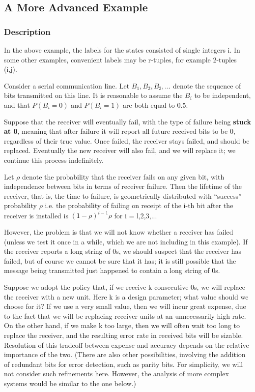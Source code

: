 \documentclass[11pt]{article}
\begin{document}
\subsection{A More Advanced Example}

\subsubsection{Description}

In the above example, the labels for the states consisted of single
integers i. In some other examples, convenient labels may be r-tuples,
for example 2-tuples (i,j).

Consider a serial communication line. Let $B_{1},B_{2},B_{3},...$ denote
the sequence of bits transmitted on this line. It is reasonable to assume the
$B_{i}$ to be independent, and that $P(B_{i}=0)$ and $P(B_{i}=1)$ are
both equal to 0.5.

Suppose that the receiver will eventually fail, with the type of failure
being \textbf{stuck at 0}, meaning that after failure it will report all
future received bits to be 0, regardless of their true value. Once
failed, the receiver stays failed, and should be replaced. Eventually
the new receiver will also fail, and we will replace it; we continue
this process indefinitely.

Let $\rho$ denote the probability that the receiver fails on any given
bit, with independence between bits in terms of receiver failure.  Then
the lifetime of the receiver, that is, the time to failure, is
geometrically distributed with ``success'' probability $\rho $ i.e. the
probability of failing on receipt of the i-th bit after the receiver is
installed is $(1-\rho)^{i-1}\rho$ for i = l,2,3,... 

However, the problem is that we will not know whether a receiver has
failed (unless we test it once in a while, which we are not including in
this example).  If the receiver reports a long string of 0s, we should
suspect that the receiver has failed, but of course we cannot be sure
that it has; it is still possible that the message being transmitted
just happened to contain a long string of 0s.

Suppose we adopt the policy that, if we receive k consecutive 0s, we
will replace the receiver with a new unit. Here k is a design parameter;
what value should we choose for it? If we use a very small value, then
we will incur great expense, due to the fact that we will be replacing
receiver units at an unnecessarily high rate. On the other hand, if we
make k too large, then we will often wait too long to replace the
receiver, and the resulting error rate in received bits will be sizable.
Resolution of this tradeoff between expense and accuracy depends on the
relative importance of the two. (There are also other possibilities,
involving the addition of redundant bits for error detection, such as
parity bits. For simplicity, we will not consider such refinements here.
However, the analysis of more complex systems would be similar to the
one below.)
\end{document}
